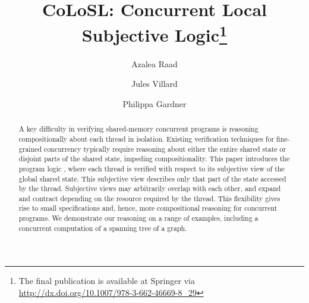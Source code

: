 \documentclass[runningheads,a4paper]{llncs}
\begin{document}
%
\title{CoLoSL: Concurrent Local Subjective Logic\thanks{The final publication is available at Springer via \url{http://dx.doi.org/10.1007/978-3-662-46669-8_29}}}
\author{Azalea Raad\and Jules Villard\and Philippa Gardner}

\maketitle

\begin{abstract}
A key difficulty in verifying shared-memory concurrent programs is
reasoning compositionally about each thread in isolation. Existing
verification techniques for fine-grained concurrency typically require
reasoning about either the entire shared state  or disjoint
parts of the shared state,  impeding compositionality.  This paper introduces
the program logic \colosl, where each thread is verified with respect
to its subjective view of the global shared state.  This subjective
view describes only that part of the state  accessed
by the thread. Subjective views may arbitrarily overlap with each
other, and expand and contract depending on the resource required by
the thread.  This flexibility gives rise to small specifications and,
hence,  more compositional reasoning for concurrent programs. We
demonstrate our reasoning on 
a range of examples,  including a concurrent
computation of a spanning tree of a graph.
\end{abstract}








%
\end{document}
